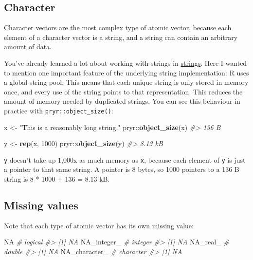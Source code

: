 \documentclass[]{book}
\newenvironment{Shaded}{\begin{snugshade}}{\end{snugshade}}
\newcommand{\KeywordTok}[1]{\textcolor[rgb]{0.13,0.29,0.53}{\textbf{{#1}}}}
\newcommand{\DecValTok}[1]{\textcolor[rgb]{0.00,0.00,0.81}{{#1}}}
\newcommand{\StringTok}[1]{\textcolor[rgb]{0.31,0.60,0.02}{{#1}}}
\newcommand{\CommentTok}[1]{\textcolor[rgb]{0.56,0.35,0.01}{\textit{{#1}}}}
\newcommand{\OtherTok}[1]{\textcolor[rgb]{0.56,0.35,0.01}{{#1}}}
\newcommand{\NormalTok}[1]{{#1}}
\begin{document}
\subsection{Character}\label{character}

Character vectors are the most complex type of atomic vector, because
each element of a character vector is a string, and a string can contain
an arbitrary amount of data.

You've already learned a lot about working with strings in
\protect\hyperlink{strings}{strings}. Here I wanted to mention one
important feature of the underlying string implementation: R uses a
global string pool. This means that each unique string is only stored in
memory once, and every use of the string points to that representation.
This reduces the amount of memory needed by duplicated strings. You can
see this behaviour in practice with \texttt{pryr::object\_size()}:

\begin{Shaded}
\begin{Highlighting}[]
\NormalTok{x <-}\StringTok{ "This is a reasonably long string."}
\NormalTok{pryr::}\KeywordTok{object_size}\NormalTok{(x)}
\CommentTok{#> 136 B}

\NormalTok{y <-}\StringTok{ }\KeywordTok{rep}\NormalTok{(x, }\DecValTok{1000}\NormalTok{)}
\NormalTok{pryr::}\KeywordTok{object_size}\NormalTok{(y)}
\CommentTok{#> 8.13 kB}
\end{Highlighting}
\end{Shaded}

\texttt{y} doesn't take up 1,000x as much memory as \texttt{x}, because
each element of \texttt{y} is just a pointer to that same string. A
pointer is 8 bytes, so 1000 pointers to a 136 B string is 8 * 1000 + 136
= 8.13 kB.

\subsection{Missing values}\label{missing-values-4}

Note that each type of atomic vector has its own missing value:

\begin{Shaded}
\begin{Highlighting}[]
\OtherTok{NA}            \CommentTok{# logical}
\CommentTok{#> [1] NA}
\OtherTok{NA_integer_}   \CommentTok{# integer}
\CommentTok{#> [1] NA}
\OtherTok{NA_real_}      \CommentTok{# double}
\CommentTok{#> [1] NA}
\OtherTok{NA_character_} \CommentTok{# character}
\CommentTok{#> [1] NA}
\end{Highlighting}
\end{Shaded}
\end{document}
